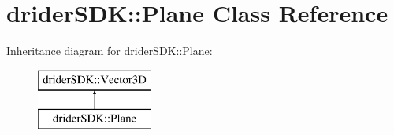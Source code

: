 \hypertarget{classdrider_s_d_k_1_1_plane}{}\section{drider\+S\+DK\+:\+:Plane Class Reference}
\label{classdrider_s_d_k_1_1_plane}
Inheritance diagram for drider\+S\+DK\+:\+:Plane\+:\begin{figure}[H]
\begin{center}
\leavevmode
\includegraphics[height=2.000000cm]{classdrider_s_d_k_1_1_plane}
\end{center}
\end{figure}
